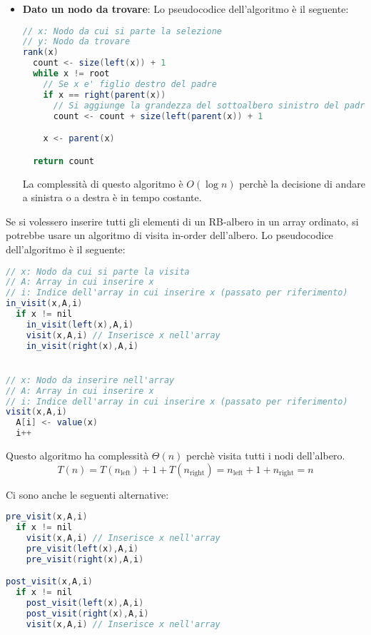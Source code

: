 \documentclass[a4paper]{article}
\begin{document}
\begin{itemize}
\begin{itemize}
  \item \textbf{Dato un nodo da trovare}:
    \vspace{1em}
    \noindent
    Lo pseudocodice dell'algoritmo è il seguente:
\begin{lstlisting}[language=Scala]
// x: Nodo da cui si parte la selezione
// y: Nodo da trovare
rank(x)
  count <- size(left(x)) + 1
  while x != root
    // Se x e' figlio destro del padre
    if x == right(parent(x))
      // Si aggiunge la grandezza del sottoalbero sinistro del padre
      count <- count + size(left(parent(x)) + 1

    x <- parent(x)

  return count
\end{lstlisting}
    La complessità di questo algoritmo è \( O(\log n) \) perchè la decisione di andare
    a sinistra o a destra è in tempo costante.
  \end{itemize}

\end{itemize}

\vspace{1em}
\noindent
Se si volessero inserire tutti gli elementi di un RB-albero in un array ordinato, si
potrebbe usare un algoritmo di visita in-order dell'albero. Lo pseudocodice dell'algoritmo
è il seguente:
\begin{lstlisting}[language=Scala]
// x: Nodo da cui si parte la visita
// A: Array in cui inserire x
// i: Indice dell'array in cui inserire x (passato per riferimento)
in_visit(x,A,i)
  if x != nil
    in_visit(left(x),A,i)
    visit(x,A,i) // Inserisce x nell'array
    in_visit(right(x),A,i)


// x: Nodo da inserire nell'array
// A: Array in cui inserire x
// i: Indice dell'array in cui inserire x (passato per riferimento)
visit(x,A,i)
  A[i] <- value(x)
  i++
\end{lstlisting}
\noindent
Questo algoritmo ha complessità \( \Theta(n) \) perchè visita tutti i nodi dell'albero.
\[
  T(n) = T(n_{\text{left}}) + 1 + T(n_{\text{right}}) = n_{\text{left}} + 1 + n_{\text{right}} = n
\] 

\vspace{1em}
\noindent
Ci sono anche le seguenti alternative:
\begin{lstlisting}[language=Scala]
pre_visit(x,A,i)
  if x != nil
    visit(x,A,i) // Inserisce x nell'array
    pre_visit(left(x),A,i)
    pre_visit(right(x),A,i)

post_visit(x,A,i)
  if x != nil
    post_visit(left(x),A,i)
    post_visit(right(x),A,i)
    visit(x,A,i) // Inserisce x nell'array
\end{lstlisting}
\end{document}
